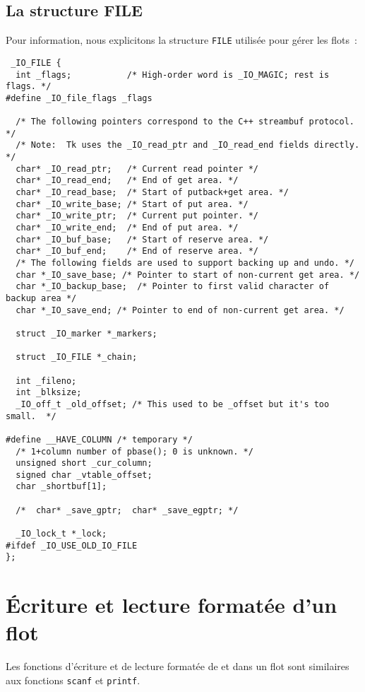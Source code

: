 \subsection{La structure FILE}
\label{sec:StructureFile}
Pour  information,   nous   explicitons la   structure   \texttt{FILE}
utilis\'ee pour g\'erer les flots~:
\begin{verbatim}
 _IO_FILE {
  int _flags;           /* High-order word is _IO_MAGIC; rest is flags. */
#define _IO_file_flags _flags

  /* The following pointers correspond to the C++ streambuf protocol. */
  /* Note:  Tk uses the _IO_read_ptr and _IO_read_end fields directly. */
  char* _IO_read_ptr;   /* Current read pointer */
  char* _IO_read_end;   /* End of get area. */
  char* _IO_read_base;  /* Start of putback+get area. */
  char* _IO_write_base; /* Start of put area. */
  char* _IO_write_ptr;  /* Current put pointer. */
  char* _IO_write_end;  /* End of put area. */
  char* _IO_buf_base;   /* Start of reserve area. */
  char* _IO_buf_end;    /* End of reserve area. */
  /* The following fields are used to support backing up and undo. */
  char *_IO_save_base; /* Pointer to start of non-current get area. */
  char *_IO_backup_base;  /* Pointer to first valid character of backup area */
  char *_IO_save_end; /* Pointer to end of non-current get area. */

  struct _IO_marker *_markers;

  struct _IO_FILE *_chain;

  int _fileno;
  int _blksize;
  _IO_off_t _old_offset; /* This used to be _offset but it's too small.  */

#define __HAVE_COLUMN /* temporary */
  /* 1+column number of pbase(); 0 is unknown. */
  unsigned short _cur_column;
  signed char _vtable_offset;
  char _shortbuf[1];

  /*  char* _save_gptr;  char* _save_egptr; */

  _IO_lock_t *_lock;
#ifdef _IO_USE_OLD_IO_FILE
};
\end{verbatim}
\section{\'Ecriture et lecture format\'ee d'un flot}
\label{sec:EcritureLectureFlot}
Les fonctions d'\'ecriture et de lecture format\'ee de et dans un flot
sont  similaires  aux   fonctions   \texttt{scanf}  et
\texttt{printf}.
